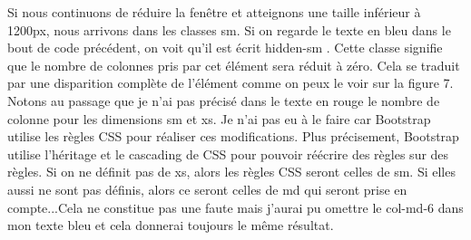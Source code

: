 \documentclass{article}
\begin{document}
Si nous continuons de r\'eduire la fen\^etre et atteignons une taille inf\'erieur \`a 1200px, nous arrivons dans les classes sm. Si on regarde le texte en bleu dans le bout de code pr\'ec\'edent, on voit qu'il est \'ecrit \og hidden-sm \fg{}. Cette classe signifie que le nombre de colonnes pris par cet \'el\'ement sera r\'eduit \`a z\'ero. Cela se traduit par une disparition compl\`ete de l'\'el\'ement comme on peux le voir sur la figure 7. Notons au passage que je n'ai pas pr\'ecis\'e dans le texte en rouge le nombre de colonne pour les dimensions sm et xs. Je n'ai pas eu \`a le faire car Bootstrap utilise les r\`egles CSS pour r\'ealiser ces modifications. Plus pr\'ecisement, Bootstrap utilise l'h\'eritage et le cascading de CSS pour pouvoir r\'e\'ecrire des r\`egles sur des r\`egles. Si on ne d\'efinit pas de xs, alors les r\`egles CSS seront celles de sm. Si elles aussi ne sont pas d\'efinis, alors ce seront celles de md qui seront prise en compte...Cela ne constitue pas une faute mais j'aurai pu omettre le \og col-md-6 \fg{} dans mon texte bleu et cela donnerai toujours le m\^eme r\'esultat.\\
\end{document}
